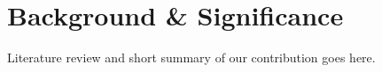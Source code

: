 \section*{Background \& Significance}

Literature review and short summary of our contribution goes here.